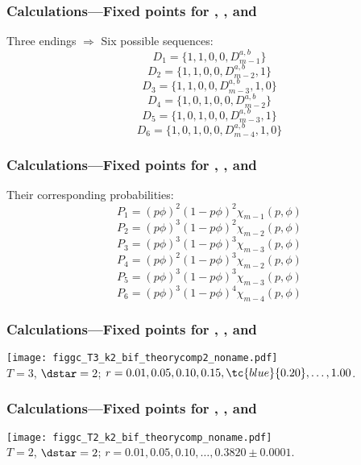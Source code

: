 \begin{frame}
  \frametitle{Calculations---Fixed points for , , and }

  Three endings $\Rightarrow$ Six possible sequences:
  $$ D_1 = \{1, 1, 0, 0, D_{m-1}^{a,b}\} $$
  $$ D_2 = \{1, 1, 0, 0, D_{m-2}^{a,b}, 1\} $$
  $$ D_3 = \{1, 1, 0, 0, D_{m-3}^{a,b}, 1, 0\}$$
  $$ D_4 = \{1, 0, 1, 0, 0, D_{m-2}^{a,b}\} $$
  $$ D_5 = \{1, 0, 1, 0, 0, D_{m-3}^{a,b}, 1\} $$
  $$ D_6 = \{1, 0, 1, 0, 0, D_{m-4}^{a,b}, 1, 0\} $$


\end{frame}

\begin{frame}
  \frametitle{Calculations---Fixed points for , , and }

  Their corresponding probabilities:
  $$ P_1 = (p\phi)^2 (1-p\phi)^2 \chi_{m-1}(p,\phi) $$
  $$ P_2 = (p\phi)^3 (1-p\phi)^2 \chi_{m-2}(p,\phi) $$
  $$ P_3 = (p\phi)^3 (1-p\phi)^3 \chi_{m-3}(p,\phi) $$
  $$ P_4 = (p\phi)^2 (1-p\phi)^3 \chi_{m-2}(p,\phi) $$
  $$ P_5 = (p\phi)^3 (1-p\phi)^3 \chi_{m-3}(p,\phi) $$
  $$ P_6 = (p\phi)^3 (1-p\phi)^4 \chi_{m-4}(p,\phi) $$
\end{frame}



\begin{frame}
  \frametitle{Calculations---Fixed points for , , and }

  \begin{center}
      \texttt{[image: figgc\_T3\_k2\_bif\_theorycomp2\_noname.pdf]}\\
      $T=3$, $\dstar=2$;
      \hfill
      $r=0.01, 0.05, 0.10, 0.15, \tc{blue}{0.20},\ldots, 1.00$.
  \end{center}
\end{frame}

\begin{frame}
  \frametitle{Calculations---Fixed points for , , and }

  \begin{center}
      \texttt{[image: figgc\_T2\_k2\_bif\_theorycomp\_noname.pdf]}\\
      $T=2$, $\dstar=2$;
      \hfill
      $r=0.01, 0.05, 0.10,\ldots, 0.3820 \pm 0.0001$.
  \end{center}
\end{frame}


